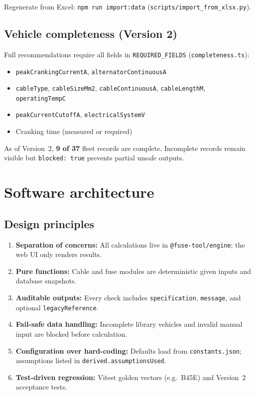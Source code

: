 \documentclass[11pt,a4paper]{report}
\begin{document}
Regenerate from Excel: \texttt{npm run import:data} (\texttt{scripts/import\_from\_xlsx.py}).

\section{Vehicle completeness (Version 2)}

Full recommendations require all fields in \texttt{REQUIRED\_FIELDS} (\texttt{completeness.ts}):

\begin{itemize}[noitemsep]
  \item \texttt{peakCrankingCurrentA}, \texttt{alternatorContinuousA}
  \item \texttt{cableType}, \texttt{cableSizeMm2}, \texttt{cableContinuousA}, \texttt{cableLengthM}, \texttt{operatingTempC}
  \item \texttt{peakCurrentCutoffA}, \texttt{electricalSystemV}
  \item Cranking time (measured or required)
\end{itemize}

As of Version~2, \textbf{9 of 37} fleet records are complete. Incomplete records remain visible but \texttt{blocked: true} prevents partial unsafe outputs.

\chapter{Software architecture}

\section{Design principles}

\begin{enumerate}[noitemsep]
  \item \textbf{Separation of concerns:} All calculations live in \texttt{@fuse-tool/engine}; the web UI only renders results.
  \item \textbf{Pure functions:} Cable and fuse modules are deterministic given inputs and database snapshots.
  \item \textbf{Auditable outputs:} Every check includes \texttt{specification}, \texttt{message}, and optional \texttt{legacyReference}.
  \item \textbf{Fail-safe data handling:} Incomplete library vehicles and invalid manual input are blocked before calculation.
  \item \textbf{Configuration over hard-coding:} Defaults load from \texttt{constants.json}; assumptions listed in \texttt{derived.assumptionsUsed}.
  \item \textbf{Test-driven regression:} Vitest golden vectors (e.g.\ B45E) and Version~2 acceptance tests.
\end{enumerate}
\end{document}
